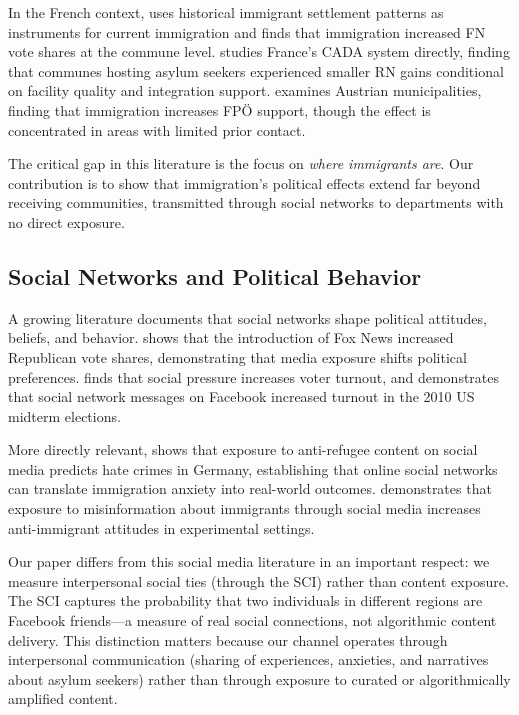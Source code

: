 \documentclass[12pt]{article}
\begin{document}
In the French context, \citet{edo2019immigration} uses historical immigrant settlement patterns as instruments for current immigration and finds that immigration increased FN vote shares at the commune level. \citet{schneider2024stranger} studies France's CADA system directly, finding that communes hosting asylum seekers experienced smaller RN gains conditional on facility quality and integration support. \citet{halla2017immigration} examines Austrian municipalities, finding that immigration increases FP\"O support, though the effect is concentrated in areas with limited prior contact.

The critical gap in this literature is the focus on \textit{where immigrants are}. Our contribution is to show that immigration's political effects extend far beyond receiving communities, transmitted through social networks to departments with no direct exposure.

\subsection{Social Networks and Political Behavior}

A growing literature documents that social networks shape political attitudes, beliefs, and behavior. \citet{dellavigna2007fox} shows that the introduction of Fox News increased Republican vote shares, demonstrating that media exposure shifts political preferences. \citet{gerber2008social} finds that social pressure increases voter turnout, and \citet{bond201261} demonstrates that social network messages on Facebook increased turnout in the 2010 US midterm elections.

More directly relevant, \citet{muller2021social} shows that exposure to anti-refugee content on social media predicts hate crimes in Germany, establishing that online social networks can translate immigration anxiety into real-world outcomes. \citet{bursztyn2020misinformation} demonstrates that exposure to misinformation about immigrants through social media increases anti-immigrant attitudes in experimental settings.

Our paper differs from this social media literature in an important respect: we measure interpersonal social ties (through the SCI) rather than content exposure. The SCI captures the probability that two individuals in different regions are Facebook friends---a measure of real social connections, not algorithmic content delivery. This distinction matters because our channel operates through interpersonal communication (sharing of experiences, anxieties, and narratives about asylum seekers) rather than through exposure to curated or algorithmically amplified content.
\end{document}
